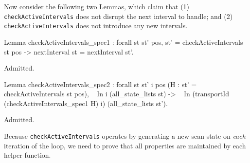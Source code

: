 \documentclass{llncs}
\begin{document}



Now consider the following two Lemmas, which claim that (1)
\texttt{checkActiveIntervals} does not disrupt the next interval to handle;
and (2) \texttt{checkActiveIntervals} does not introduce any new intervals.


\begin{MyCoqExampleStar}
Lemma checkActiveIntervals_spec1 : forall st st' pos,
  st' = checkActiveIntervals st pos
    -> nextInterval st = nextInterval st'.
\end{MyCoqExampleStar}
\begin{MyCoqEval}
Admitted.
\end{MyCoqEval}

\begin{MyCoqExampleStar}
Lemma checkActiveIntervals_spec2 : forall st st' i pos
  (H : st' = checkActiveIntervals st pos),
  ~ In i (all_state_lists st)
    -> ~ In (transportId (checkActiveIntervals_spec1 H) i)
            (all_state_lists st').
\end{MyCoqExampleStar}
\begin{MyCoqEval}
Admitted.
\end{MyCoqEval}

Because \texttt{checkActiveIntervals} operates by generating a new scan state
on \emph{each} iteration of the loop, we need to prove that all properties are
maintained by each helper function.

\end{document}
